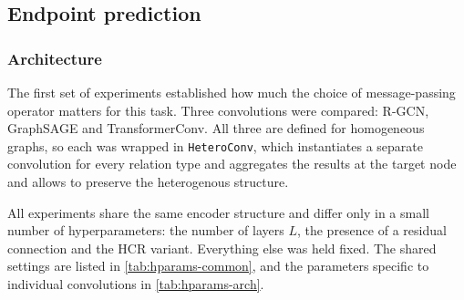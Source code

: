 \newpage
\subsection{Endpoint prediction}

\subsubsection{Architecture}

The first set of experiments established how much the choice of
message-passing operator matters for this task. Three convolutions were
compared: R-GCN, GraphSAGE and TransformerConv. All three are defined for
homogeneous graphs, so each was wrapped in \texttt{HeteroConv}, which
instantiates a separate convolution for every relation type and aggregates
the results at the target node and allows to preserve the heterogenous structure. 

All experiments share the same encoder structure and differ only in a small
number of hyperparameters: the number of layers $L$, the presence of a
residual connection and the HCR variant. Everything
else was held fixed. The shared settings are listed in
\cref{tab:hparams-common}, and the parameters specific to individual
convolutions in \cref{tab:hparams-arch}.

